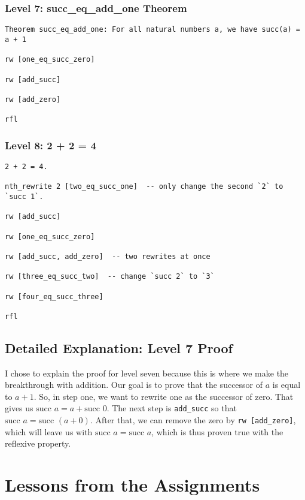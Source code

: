 \documentclass{article}
\begin{document}
\subsubsection*{Level 7: succ\_eq\_add\_one Theorem}
\begin{lstlisting}[style=leanstyle]
Theorem succ_eq_add_one: For all natural numbers a, we have succ(a) = a + 1

rw [one_eq_succ_zero]

rw [add_succ]

rw [add_zero]

rfl
\end{lstlisting}

\subsubsection*{Level 8: 2 + 2 = 4}
\begin{lstlisting}[style=leanstyle]
2 + 2 = 4.

nth_rewrite 2 [two_eq_succ_one]  -- only change the second `2` to `succ 1`.

rw [add_succ]

rw [one_eq_succ_zero]

rw [add_succ, add_zero]  -- two rewrites at once

rw [three_eq_succ_two]  -- change `succ 2` to `3`

rw [four_eq_succ_three]

rfl
\end{lstlisting}

\subsection*{Detailed Explanation: Level 7 Proof}
I chose to explain the proof for level seven because this is where we make the breakthrough with addition. Our goal is to prove that the successor of \(a\) is equal to \(a + 1\). So, in step one, we want to rewrite one as the successor of zero. That gives us \(\text{succ } a = a + \text{succ } 0\). The next step is \texttt{add\_succ} so that \(\text{succ } a = \text{succ } (a + 0)\). After that, we can remove the zero by \texttt{rw [add\_zero]}, which will leave us with \(\text{succ } a = \text{succ } a\), which is thus proven true with the reflexive property.

\section*{Lessons from the Assignments}
\end{document}
